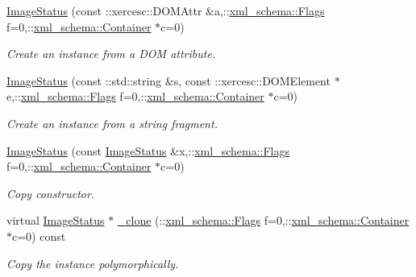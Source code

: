 \begin{DoxyCompactItemize}
\hyperlink{classopenstack_1_1xml_1_1ImageStatus_ad8bbee88aa0c0da4b9b3e9c8012e1439}{ImageStatus} (const ::xercesc::DOMAttr \&a,::\hyperlink{namespacexml__schema_affb4c227cbd9aa7453dd1dc5a1401943}{xml\_\-schema::Flags} f=0,::\hyperlink{namespacexml__schema_a333dea2213742aea47a37532dec4ec27}{xml\_\-schema::Container} $\ast$c=0)
\begin{DoxyCompactList}\small\item\em Create an instance from a DOM attribute. \item\end{DoxyCompactList}\item 
\hyperlink{classopenstack_1_1xml_1_1ImageStatus_a0b0d3529a431795d4566bcbbc948625f}{ImageStatus} (const ::std::string \&s, const ::xercesc::DOMElement $\ast$e,::\hyperlink{namespacexml__schema_affb4c227cbd9aa7453dd1dc5a1401943}{xml\_\-schema::Flags} f=0,::\hyperlink{namespacexml__schema_a333dea2213742aea47a37532dec4ec27}{xml\_\-schema::Container} $\ast$c=0)
\begin{DoxyCompactList}\small\item\em Create an instance from a string fragment. \item\end{DoxyCompactList}\item 
\hyperlink{classopenstack_1_1xml_1_1ImageStatus_ab2e537c315336d7759276ec9ff8e4c0a}{ImageStatus} (const \hyperlink{classopenstack_1_1xml_1_1ImageStatus}{ImageStatus} \&x,::\hyperlink{namespacexml__schema_affb4c227cbd9aa7453dd1dc5a1401943}{xml\_\-schema::Flags} f=0,::\hyperlink{namespacexml__schema_a333dea2213742aea47a37532dec4ec27}{xml\_\-schema::Container} $\ast$c=0)
\begin{DoxyCompactList}\small\item\em Copy constructor. \item\end{DoxyCompactList}\item 
virtual \hyperlink{classopenstack_1_1xml_1_1ImageStatus}{ImageStatus} $\ast$ \hyperlink{classopenstack_1_1xml_1_1ImageStatus_a3a1edf6da162a145df638eb28206fe93}{\_\-clone} (::\hyperlink{namespacexml__schema_affb4c227cbd9aa7453dd1dc5a1401943}{xml\_\-schema::Flags} f=0,::\hyperlink{namespacexml__schema_a333dea2213742aea47a37532dec4ec27}{xml\_\-schema::Container} $\ast$c=0) const 
\begin{DoxyCompactList}\small\item\em Copy the instance polymorphically. \item\end{DoxyCompactList}\item 

\end{DoxyCompactItemize}
